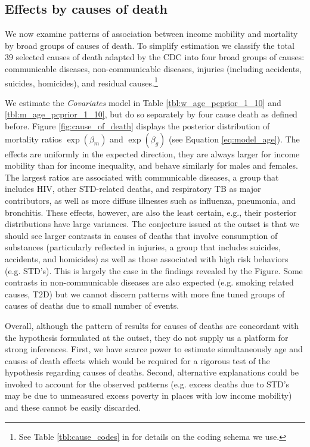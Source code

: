 \documentclass[11pt]{article}
\begin{document}
\subsection{Effects by causes of death}

We now examine patterns of  association between income mobility and mortality by broad groups of causes of death. To simplify estimation we classify the total 39 selected causes of death adapted by the CDC into four broad groups of causes: communicable diseases, non-communicable diseases, injuries (including accidents, suicides, homicides), and residual causes.\footnote{See Table \ref{tbl:cause_codes} in \textit{} for details on the coding schema we use.} 

We estimate the \textit{Covariates} model in Table \ref{tbl:w_age_pcprior_1_10} and \ref{tbl:m_age_pcprior_1_10}, but do so separately by four cause death as defined before. Figure \ref{fig:cause_of_death} displays the posterior distribution of mortality ratios $\exp{(\beta_{m})}$ and $\exp{(\beta_{g})}$ (see Equation \ref{eq:model_age}). The effects are uniformly in the expected direction, they are always larger for income mobility than for income inequality, and behave similarly for males and females. The largest ratios are associated with communicable diseases, a group that includes HIV, other STD-related deaths, and respiratory TB as major contributors, as well as more diffuse illnesses such as influenza, pneumonia, and bronchitis. These effects, however, are also the least certain, e.g., their posterior distributions have large variances. The conjecture issued at the outset is that we should see larger contrasts in causes of deaths that involve consumption of substances (particularly reflected in injuries, a group that includes suicides, accidents, and homicides) as well as those associated with high risk behaviors (e.g. STD's). This is largely the case in the findings revealed by the Figure. Some contrasts in non-communicable diseases are also expected (e.g. smoking related causes, T2D) but we cannot discern patterns with more fine tuned groups of causes of deaths due to small number of events. 

Overall, although the pattern of results for causes of deaths are concordant with the hypothesis formulated at the outset, they do not supply us a platform for strong inferences. First, we have scarce power to estimate simultaneously age and causes of death effects which would be required for a rigorous test of the hypothesis regarding causes of deaths. Second, alternative explanations could be invoked to account for the observed patterns (e.g. excess deaths due to STD's may be due to unmeasured excess poverty in places with low income mobility) and these cannot be easily discarded.
 
\end{document}
